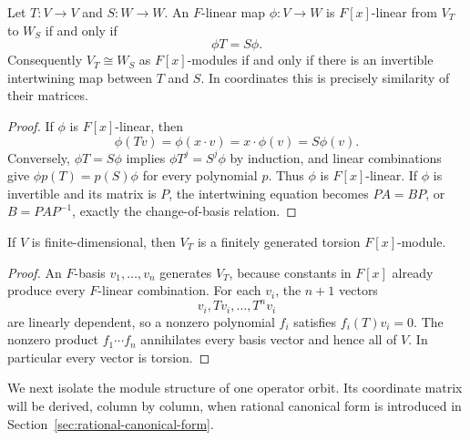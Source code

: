\begin{proposition}\label{prop:intertwiner-module-map}
Let \(T:V\to V\) and \(S:W\to W\).  An \(F\)-linear map
\(\phi:V\to W\) is \(F[x]\)-linear from \(V_T\) to \(W_S\) if and only if
\[
\phi T=S\phi.
\]
Consequently \(V_T\cong W_S\) as \(F[x]\)-modules if and only if there is
an invertible intertwining map between \(T\) and \(S\).  In coordinates this
is precisely similarity of their matrices.
\end{proposition}
\begin{proof}
If \(\phi\) is \(F[x]\)-linear, then
\[
\phi(Tv)=\phi(x\cdot v)=x\cdot\phi(v)=S\phi(v).
\]
Conversely, \(\phi T=S\phi\) implies \(\phi T^j=S^j\phi\) by induction,
and linear combinations give
\(\phi p(T)=p(S)\phi\) for every polynomial \(p\).  Thus \(\phi\) is
\(F[x]\)-linear.  If \(\phi\) is invertible and its matrix is \(P\), the
intertwining equation becomes \(PA=BP\), or \(B=PAP^{-1}\), exactly the
change-of-basis relation.
\end{proof}

\begin{proposition}
\label{prop:operator-module-torsion}
If \(V\) is finite-dimensional, then \(V_T\) is a finitely generated torsion
\(F[x]\)-module.
\end{proposition}
\begin{proof}
An \(F\)-basis \(v_1,\ldots,v_n\) generates \(V_T\), because constants in
\(F[x]\) already produce every \(F\)-linear combination.  For each \(v_i\),
the \(n+1\) vectors
\[
v_i,Tv_i,\ldots,T^nv_i
\]
are linearly dependent, so a nonzero polynomial \(f_i\) satisfies
\(f_i(T)v_i=0\).  The nonzero product \(f_1\cdots f_n\) annihilates every
basis vector and hence all of \(V\).  In particular every vector is torsion.
\end{proof}

We next isolate the module structure of one operator orbit. Its coordinate
matrix will be derived, column by column, when rational canonical form is
introduced in Section~\ref{sec:rational-canonical-form}.

